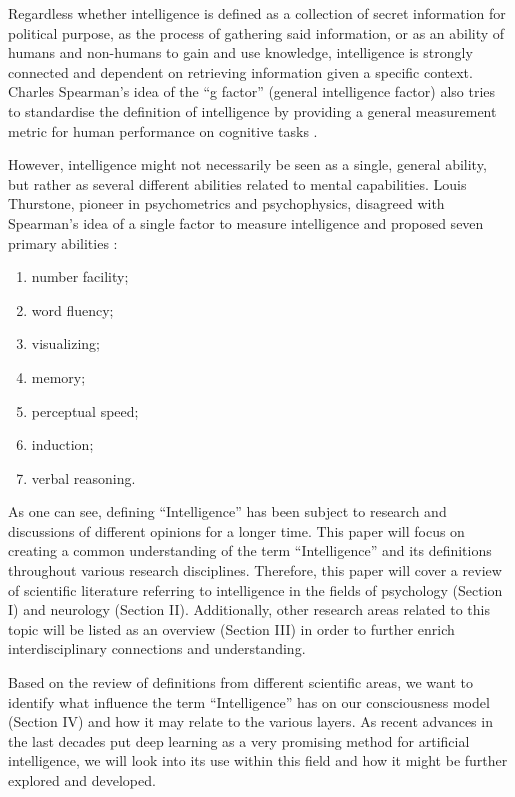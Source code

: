 \documentclass[conference]{IEEEtran}
\begin{document}
	Regardless whether intelligence is defined as a collection of secret information for political purpose, as the process of gathering said information, or as an ability of humans and non-humans to gain and use knowledge, intelligence is strongly connected and dependent on retrieving information given a specific context. Charles Spearman’s idea of the “g factor” (general intelligence factor) also tries to standardise the definition of intelligence by providing a general measurement metric for human performance on cognitive tasks \cite{a3}.

	However, intelligence might not necessarily be seen as a single, general ability, but rather as several different abilities related to mental capabilities. Louis Thurstone, pioneer in psychometrics and psychophysics, disagreed with Spearman’s idea of a single factor to measure intelligence and proposed seven primary abilities \cite{a4}:

	\begin{enumerate}
		\item number facility;
		\item word fluency;
		\item visualizing;
		\item memory;
		\item perceptual speed;
		\item induction;
		\item verbal reasoning.
	\end{enumerate}

	As one can see, defining “Intelligence” has been subject to research and discussions of different opinions for a longer time. This paper will focus on creating a common understanding of the term “Intelligence” and its definitions throughout various research disciplines. Therefore, this paper will cover a review of scientific literature referring to intelligence in the fields of psychology (Section I) and neurology (Section II). Additionally, other research areas related to this topic will be listed as an overview (Section III)  in order to further enrich interdisciplinary connections and understanding.

	Based on the review of definitions from different scientific areas, we want to identify what influence the term “Intelligence” has on our consciousness model (Section IV) and how it may relate to the various layers. As recent advances in the last decades put deep learning as a very promising method for artificial intelligence, we will look into its use within this field and how it might be further explored and developed.
\end{document}
